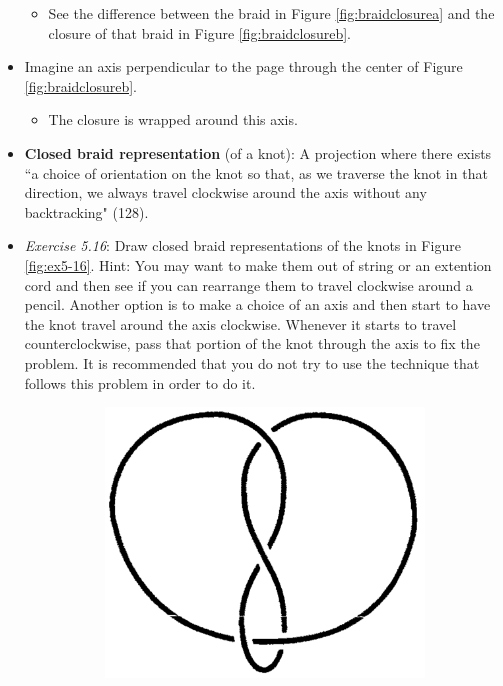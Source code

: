 \documentclass[titlepage]{article}
\numberwithin{figure}{section}
\numberwithin{table}{section}
\numberwithin{equation}{section}
\newcommand{\dq}[2]{``#1" (#2).}
\begin{document}
\begin{itemize}
    \begin{itemize}
        \item See the difference between the braid in Figure \ref{fig:braidclosurea} and the closure of that braid in Figure \ref{fig:braidclosureb}.
    \end{itemize}
    \item Imagine an axis perpendicular to the page through the center of Figure \ref{fig:braidclosureb}.
    \begin{itemize}
        \item The closure is wrapped around this axis.
    \end{itemize}
    \item \textbf{Closed braid representation} (of a knot): A projection where there exists \dq{a choice of orientation on the knot so that, as we traverse the knot in that direction, we always travel clockwise around the axis without any backtracking}{128}
    \item \emph{Exercise 5.16}: Draw closed braid representations of the knots in Figure \ref{fig:ex5-16}. Hint: You may want to make them out of string or an extention cord and then see if you can rearrange them to travel clockwise around a pencil. Another option is to make a choice of an axis and then start to have the knot travel around the axis clockwise. Whenever it starts to travel counterclockwise, pass that portion of the knot through the axis to fix the problem. It is recommended that you do not try to use the technique that follows this problem in order to do it.
    \begin{figure}[h!]
        \centering
        \begin{subfigure}[b]{0.2\linewidth}
            \centering
            \includegraphics[width=0.8\linewidth]{Blender/ex3-8b.png}

\end{subfigure}
\end{figure}
\end{itemize}
\end{document}
